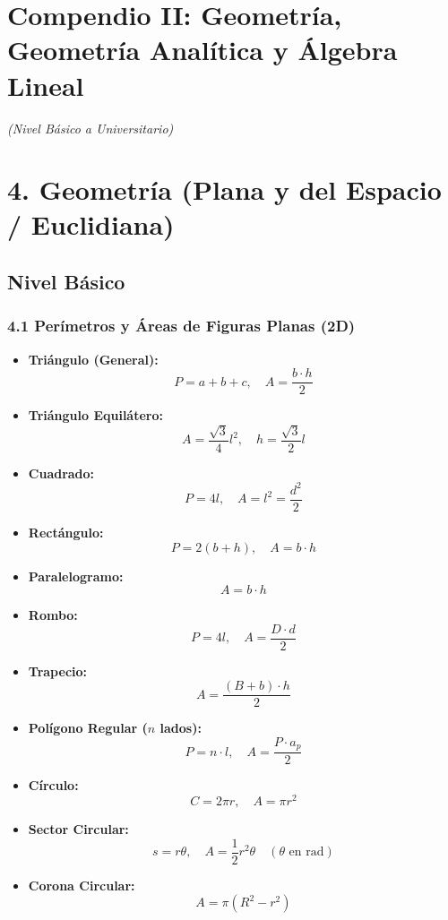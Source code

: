\documentclass[11pt,a4paper]{article}
\begin{document}
\section*{Compendio II: Geometría, Geometría Analítica y Álgebra Lineal}

\textit{(Nivel Básico a Universitario)}

\section*{4. Geometría (Plana y del Espacio / Euclidiana)}

\subsection*{Nivel Básico}

\subsubsection*{4.1 Perímetros y Áreas de Figuras Planas (2D)}

\begin{itemize}
  \item \textbf{Triángulo (General):}
  \[
    P = a + b + c, \quad A = \frac{b \cdot h}{2}
  \]
  \item \textbf{Triángulo Equilátero:}
  \[
    A = \frac{\sqrt{3}}{4} l^2, \quad h = \frac{\sqrt{3}}{2} l
  \]
  \item \textbf{Cuadrado:}
  \[
    P = 4l, \quad A = l^2 = \frac{d^2}{2}
  \]
  \item \textbf{Rectángulo:}
  \[
    P = 2(b + h), \quad A = b \cdot h
  \]
  \item \textbf{Paralelogramo:}
  \[
    A = b \cdot h
  \]
  \item \textbf{Rombo:}
  \[
    P = 4l, \quad A = \frac{D \cdot d}{2}
  \]
  \item \textbf{Trapecio:}
  \[
    A = \frac{(B + b) \cdot h}{2}
  \]
  \item \textbf{Polígono Regular ($n$ lados):}
  \[
    P = n \cdot l, \quad A = \frac{P \cdot a_p}{2}
  \]
  \item \textbf{Círculo:}
  \[
    C = 2\pi r, \quad A = \pi r^2
  \]
  \item \textbf{Sector Circular:}
  \[
    s = r\theta, \quad A = \frac{1}{2} r^2 \theta \quad (\theta \text{ en rad})
  \]
  \item \textbf{Corona Circular:}
  \[
    A = \pi(R^2 - r^2)
  \]
\end{itemize}
\end{document}
